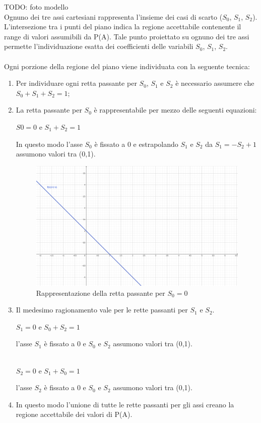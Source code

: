 TODO: foto modello\\

\noindent
Ognuno dei tre assi cartesiani rappresenta l'insieme dei casi di scarto ($S_0$, $S_1$, $S_2$). L'intersezione tra i punti del piano indica la regione accettabile contenente il range di valori assumibili da P(A). Tale punto proiettato su ognuno dei tre assi permette l'individuazione esatta dei coefficienti delle variabili $S_0$, $S_1$, $S_2$.\\\\
Ogni porzione della regione del piano viene individuata con la seguente tecnica:
\begin{enumerate}
\item Per individuare ogni retta passante per $S_0$, $S_1$ e $S_2$ \`e necessario assumere che $S_0+S_1+S_2=1$;
\item La retta passante per $S_0$ \`e rappresentabile per mezzo delle seguenti equazioni:
\begin{center}$S0=0$ e $S_1+S_2=1$\end{center}
In questo modo l'asse $S_0$ \`e fissato a 0 e estrapolando $S_1$ e $S_2$ da $S_1=-S_2+1$  assumono valori tra (0,1). 
\begin{figure}[H]
\centering
	\includegraphics[width=0.90\linewidth]{./image/equazioneretta.png}
	\caption{Rappresentazione della retta passante per $S_0=0$}
\end{figure}
\item Il medesimo ragionamento vale per le rette passanti per $S_1$ e $S_2$.

\begin{center}$S_1=0$ e $S_0+S_2=1$\end{center}
l'asse $S_1$ \`e fissato a 0 e $S_0$ e $S_2$ assumono valori tra (0,1).\\\\

\begin{center} $S_2=0$ e $S_1+S_0=1$ \end{center}
l'asse $S_2$ \`e fissato a 0 e $S_0$ e $S_2$ assumono valori tra (0,1).

\item In questo modo l'unione di tutte le rette passanti per gli assi creano la regione accettabile dei valori di P(A).
\end{enumerate}


